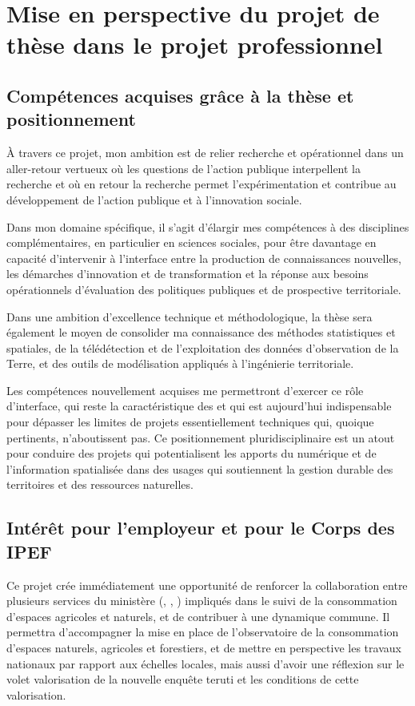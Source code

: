 \section[suites]
{Mise en perspective du projet de thèse dans le projet professionnel}

\subsection
{Compétences acquises grâce à la thèse et positionnement}

À travers ce projet, mon ambition est de relier recherche et opérationnel dans
un aller-retour vertueux où les questions de l’action publique interpellent la
recherche et où en retour la recherche permet l’expérimentation et contribue
au développement de l’action publique et à l'innovation sociale.

Dans mon domaine spécifique, il s'agit d'élargir mes compétences à des
disciplines complémentaires, en particulier en sciences sociales, pour être
davantage en capacité d'intervenir à l'interface entre la production de
connaissances nouvelles, les démarches d'innovation et de transformation et la
réponse aux besoins opérationnels d'évaluation des politiques publiques et de
prospective territoriale.

Dans une ambition d'excellence technique et méthodologique,
la thèse sera également le moyen de consolider ma connaissance
des méthodes statistiques et spatiales, de la télédétection
et de l'exploitation des données d'observation de la Terre,
et des outils de modélisation appliqués à l'ingénierie territoriale.

Les compétences nouvellement acquises me permettront d'exercer
ce rôle d'interface, qui reste la caractéristique des {\IPEF}
et qui est aujourd'hui indispensable pour dépasser les limites
de projets essentiellement techniques qui, quoique pertinents, n'aboutissent
pas. Ce positionnement pluridisciplinaire est un atout pour conduire des
projets qui potentialisent les apports du numérique et de
l'information spatialisée dans des usages qui soutiennent la gestion durable
des territoires et des ressources naturelles.

\subsection
{Intérêt pour l'employeur et pour le Corps des IPEF}

Ce projet crée immédiatement une opportunité de renforcer la collaboration
entre plusieurs services du ministère ({\DGPE}, {\SSP}, {\SDSI})
impliqués dans le suivi de la consommation
d’espaces agricoles et naturels, et de contribuer à une dynamique commune.
Il permettra d’accompagner la mise en place de 
l’observatoire de la consommation d’espaces naturels, agricoles et forestiers,
et de mettre en perspective les travaux nationaux par rapport aux
échelles locales, mais aussi d'avoir une réflexion sur le volet
valorisation de la nouvelle enquête {\sc teruti}
et les conditions de cette valorisation.

